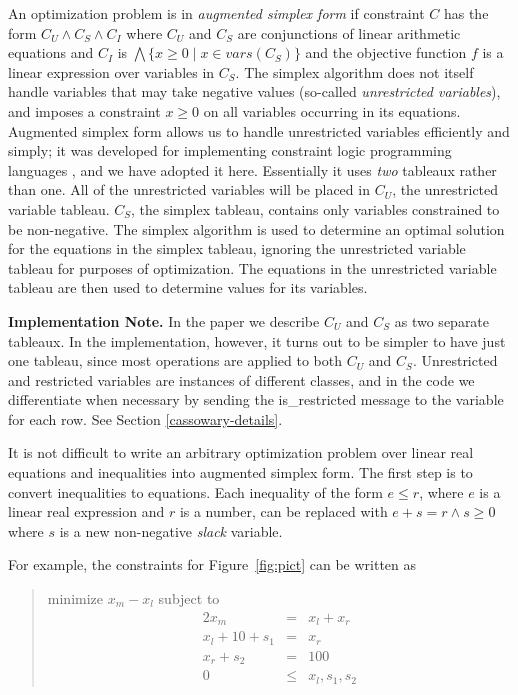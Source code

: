 \documentclass{article}
\begin{document}
An optimization problem is in \emph{augmented simplex form} if constraint
$C$ has the form $C_U \wedge C_S \wedge C_I$ where $C_U$ and $C_S$ are
conjunctions of linear arithmetic equations and $C_I$ is $\bigwedge \{ x
\geq 0 \mid x \in vars(C_S)\}$ and the objective function $f$ is a linear
expression over variables in $C_S$\@.  The simplex algorithm does not itself
handle variables that may take negative values (so-called {\em
unrestricted variables}), and imposes a constraint $x \geq 0$ on all
variables occurring in its equations.  Augmented simplex form allows us to
handle unrestricted variables efficiently and simply; it was developed for
implementing constraint logic programming languages
\cite{marriott-stuckey-book}, and we have adopted it here.  Essentially it
uses {\em two} tableaux rather than one.  All of the unrestricted
variables will be placed in $C_U$, the unrestricted variable tableau.
$C_S$, the simplex tableau, contains only variables constrained to be
non-negative.  The simplex algorithm is used to determine an optimal
solution for the equations in the simplex tableau, ignoring the
unrestricted variable tableau for purposes of optimization.  The equations
in the unrestricted variable tableau are then used to determine values for
its variables.

{\bf Implementation Note.}  In the paper we describe $C_U$ and $C_S$ as
two separate tableaux.  In the implementation, however, it turns out to be
simpler to have just one tableau, since most operations are applied to both
$C_U$ and $C_S$.  Unrestricted and restricted variables are instances of
different classes, and in the code
we differentiate when necessary by sending the {\sf
is\_restricted} message to the variable for each row.  See Section
\ref{cassowary-details}.

It is not difficult to write an arbitrary optimization problem over linear
real equations and inequalities into augmented simplex form.  The first
step is to convert inequalities to equations.  Each inequality of the form
$e \leq r$, where $e$ is a linear real expression and $r$ is a number, can be
replaced with $e + s = r \wedge s \geq 0$ where $s$ is a new non-negative
\emph{slack} variable.

For example, the constraints for Figure~\ref{fig:pict} can be written as
\begin{quote}\vspace*{-1ex}
minimize $x_m - x_l$ 
subject to 
$$\begin{array}{rcl}
2 x_m & = & x_l + x_r \\
x_l + 10 + s_1& = &x_r \\
x_r + s_2 &= &100 \\
0 &\leq & x_l, s_1, s_2
\end{array}$$
\end{quote}\vspace{-0.9ex}
\end{document}

